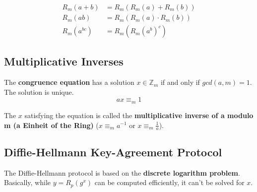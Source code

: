 \documentclass[11pt]{article}
\begin{document}
\begin{equation*}
\begin{split}
	R_m(a + b) & = R_m(R_m(a) + R_m(b)) \\
	R_m(ab) & = R_m(R_m(a) \cdot R_m(b)) \\
	R_m(a^{bc}) & = R_m(R_m(a^b)^c)
\end{split}
\end{equation*}

\subsection{Multiplicative Inverses}

The \textbf{congruence equation} has a solution $x \in \mathbb{Z}_m$ if and only if $gcd(a, m) =1$. The solution is unique.
\begin{equation*}
	ax \equiv_m 1
\end{equation*}

The $x$ satisfying the equation is called the \textbf{multiplicative inverse of a modulo m (a Einheit of the Ring)} ($x \equiv_m a^{-1}$ or $x \equiv_m \frac{1}{a}$). 

\subsection{Diffie-Hellmann Key-Agreement Protocol}

The Diffie-Hellmann protocol is based on the \textbf{discrete logarithm problem}. Basically, while $y = R_p(g^x)$ can be computed efficiently, it can't be solved for $x$.
\end{document}
